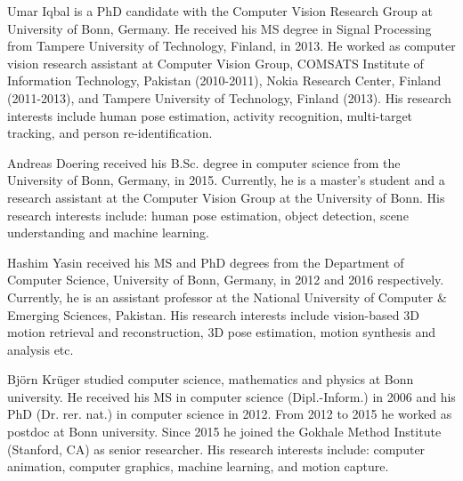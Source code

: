 \documentclass[10pt,journal,compsoc]{IEEEtran}
\begin{document}
\ifCLASSOPTIONcaptionsoff
  \newpage
\fi













\begin{IEEEbiography}
{Umar Iqbal}
is a PhD candidate with the Computer Vision Research Group at University of Bonn, Germany. He
received his MS degree in Signal Processing from Tampere University of Technology, Finland, in 2013. He
worked as computer vision research assistant at Computer
Vision Group, COMSATS Institute of Information Technology, Pakistan (2010-2011), Nokia Research Center, Finland
(2011-2013), and Tampere University of Technology, Finland (2013). His research interests include human pose estimation,
activity recognition, multi-target tracking, and person re-identification.
\end{IEEEbiography}

\begin{IEEEbiography}
{Andreas Doering} received his B.Sc. degree in computer science from the University of Bonn, Germany, 
in 2015. Currently, he is a master's student and a research assistant at the Computer Vision Group at the University of Bonn. 
His research interests include: human pose estimation, object detection, scene understanding and machine learning.

\end{IEEEbiography}

\begin{IEEEbiography}
{Hashim Yasin} received his MS and PhD degrees from the Department of Computer Science, University of Bonn, Germany, 
in 2012 and 2016 respectively. Currently, he is an assistant professor at the 
National University of Computer \& Emerging Sciences, Pakistan. His research interests include
vision-based 3D motion retrieval and reconstruction, 3D pose estimation, motion synthesis and analysis etc.
\end{IEEEbiography}

\begin{IEEEbiography}{Bj\"orn Kr\"uger}
studied computer science, mathematics and physics at Bonn university. He 
received his MS in computer science (Dipl.-Inform.) in 2006 and his PhD 
(Dr. rer. nat.) in computer science in 2012. From 2012 to 2015 he worked 
as postdoc at Bonn university. Since 2015 he joined the Gokhale Method 
Institute (Stanford, CA) as senior researcher.
His research interests include: computer animation, computer graphics, 
machine learning, and motion capture.
\end{IEEEbiography}
\end{document}
